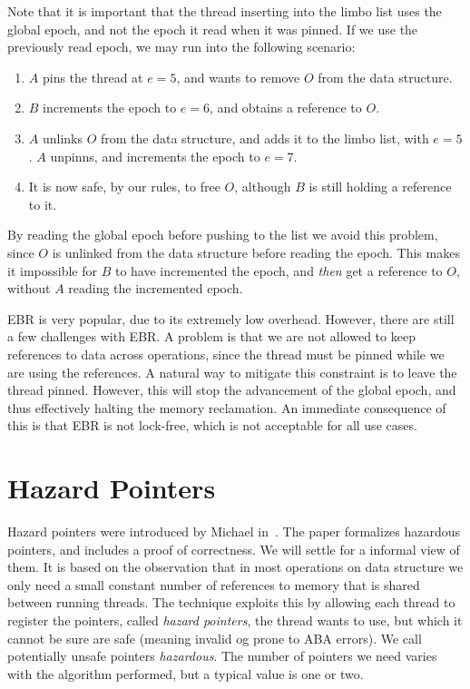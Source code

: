 \documentclass[b5paper]{report}
\begin{document}
Note that it is important that the thread inserting into the limbo list uses the
global epoch, and not the epoch it read when it was pinned. If we use the
previously read epoch, we may run into the following scenario:
\begin{enumerate}
  \item $A$ pins the thread at $e=5$, and wants to remove $O$ from the data structure.
  \item $B$ increments the epoch to $e=6$, and obtains a reference to $O$.
  \item $A$ unlinks $O$ from the data structure, and adds it to the limbo list,
    with $e=5$. $A$ unpinns, and increments the epoch to $e=7$.
  \item It is now safe, by our rules, to free $O$, although $B$ is still holding
    a reference to it.
\end{enumerate}
By reading the global epoch before pushing to the list we avoid this problem,
since $O$ is unlinked from the data structure before reading the epoch. This
makes it impossible for $B$ to have incremented the epoch, and \emph{then} get a
reference to $O$, without $A$ reading the incremented epoch.

EBR is very popular, due to its extremely low overhead.  However, there are
still a few challenges with EBR\@. A problem is that we are not allowed to keep
references to data across operations, since the thread must be pinned while we
are using the references. A natural way to mitigate this constraint is to leave
the thread pinned. However, this will stop the advancement of the global epoch,
and thus effectively halting the memory reclamation. An immediate consequence of
this is that EBR is not lock-free, which is not acceptable for all use cases.

\section{Hazard Pointers\label{sec:hp}}

Hazard pointers were introduced by Michael in~\cite{michael2004hazard}.  The
paper formalizes hazardous pointers, and includes a proof of correctness. We
will settle for a informal view of them. It is based on the observation that in
most operations on data structure we only need a small constant number of
references to memory that is shared between running threads. The technique
exploits this by allowing each thread to register the pointers, called
\emph{hazard pointers}, the thread wants to use, but which it cannot be sure are
safe (meaning invalid og prone to ABA errors). We call potentially unsafe
pointers \emph{hazardous}. The number of pointers we need varies with the
algorithm performed, but a typical value is one or two.
\end{document}
